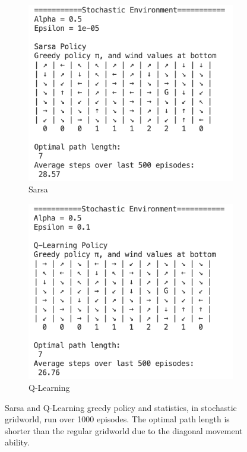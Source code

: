 \documentclass{article}
\begin{document}
\begin{figure}[h!]
  \centering
  \begin{subfigure}{0.4\textwidth} 
    \includegraphics[width=\textwidth]{sarsa_stochastic_example.png}
    \caption{Sarsa}
  \end{subfigure}
  \hspace{0.05\textwidth}  
  \begin{subfigure}{0.4\textwidth}  
    \includegraphics[width=\textwidth]{q_stochastic_example.png}
    \caption{Q-Learning}
  \end{subfigure}
  \caption{Sarsa and Q-Learning greedy policy and statistics, in stochastic gridworld, run over 1000 episodes. The optimal path length is shorter than the regular gridworld due to the diagonal movement ability.}
  
  \label{fig:stochastic_example_policy}
\end{figure}
\end{document}
